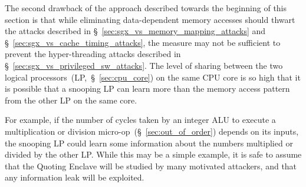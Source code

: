 The second drawback of the approach described towards the beginning of this
section is that while eliminating data-dependent memory accesses should
thwart the attacks described in \S~\ref{sec:sgx_vs_memory_mapping_attacks} and
\S~\ref{sec:sgx_vs_cache_timing_attacks}, the measure may not be sufficient to
prevent the hyper-threading attacks described in
\S~\ref{sec:sgx_vs_privileged_sw_attacks}. The level of sharing between the two
logical processors~(LP,~\S~\ref{sec:cpu_core}) on the same CPU core is so high
that it is possible that a snooping LP can learn more than the memory access
pattern from the other LP on the same core.

For example, if the number of cycles taken by an integer ALU to execute a
multiplication or division micro-op~(\S~\ref{sec:out_of_order}) depends on its
inputs, the snooping LP could learn some information about the numbers
multiplied or divided by the other LP. While this may be a simple example, it
is safe to assume that the Quoting Enclave will be studied by many motivated
attackers, and that any information leak will be exploited.

